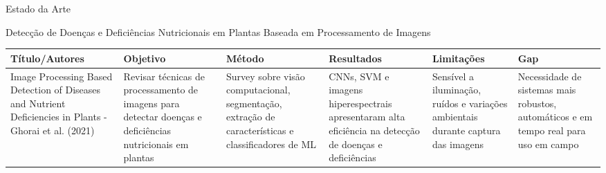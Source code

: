 \documentclass[aspectratio=169]{beamer}
\begin{document}
\begin{frame}[t]{Estado da Arte}
  \scriptsize

  Detecção de Doenças e Deficiências Nutricionais em Plantas
  Baseada em Processamento de Imagens

  \vspace{0.3cm}
  
  \begin{table}
    \centering
    \tiny
    \begin{tabular}{|p{2.5cm}|p{2cm}|p{2cm}|p{2cm}|p{2cm}|p{1.5cm}|}
      \hline
      \textbf{Título/Autores} & \textbf{Objetivo} & \textbf{Método} & \textbf{Resultados} & \textbf{Limitações} & \textbf{Gap} \\
      \hline
      Image Processing Based Detection of Diseases and Nutrient Deficiencies in Plants - Ghorai et al. (2021)
      & Revisar técnicas de processamento de imagens para detectar doenças e deficiências nutricionais em plantas
      & Survey sobre visão computacional, segmentação, extração de características e classificadores de ML
      & CNNs, SVM e imagens hiperespectrais apresentaram alta eficiência na detecção de doenças e deficiências
      & Sensível a iluminação, ruídos e variações ambientais durante captura das imagens
      & Necessidade de sistemas mais robustos, automáticos e em tempo real para uso em campo
      \\
      \hline

    \end{tabular}
  \end{table}
\end{frame}
\end{document}
